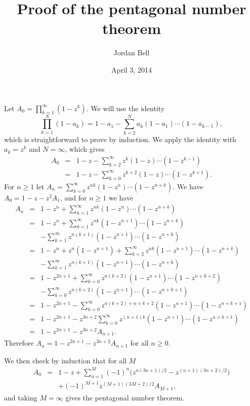 \documentclass{article}
\begin{document}
\title{Proof of the pentagonal number theorem}
\author{Jordan Bell}
\date{April 3, 2014}
\maketitle

Let $A_0=\prod_{k=1}^\infty (1-z^k)$. We will use the identity
\[
\prod_{k=1}^N (1-a_k) = 1- a_1 - \sum_{k=2}^N a_k(1-a_1)\cdots(1-a_{k-1}),
\]
which 
is straightforward to prove by induction. We apply the identity with $a_k=z^k$ and $N=\infty$, which gives
\begin{eqnarray*}
A_0&=&1-z-\sum_{k=2}^\infty z^k(1-z)\cdots(1-z^{k-1})\\
&=&1-z-\sum_{k=0}^\infty z^{k+2}(1-z)\cdots(1-z^{k+1}).
\end{eqnarray*}
For $n \geq 1$ let
$A_n=\sum_{k=0}^\infty z^{nk}(1-z^n)\cdots (1-z^{n+k})$. We have
$A_0=1-z-z^2A_1$, and for $n \geq 1$ we have
\begin{eqnarray*}
A_n&=&1-z^n+\sum_{k=1}^\infty z^{nk}(1-z^n)\cdots(1-z^{n+k})\\
&=&1-z^n+\sum_{k=1}^\infty z^{nk}(1-z^{n+1})\cdots(1-z^{n+k})\\
&&-\sum_{k=1}^\infty z^{n(k+1)}(1-z^{n+1})\cdots(1-z^{n+k})\\
&=&1-z^n+z^n(1-z^{n+1})+\sum_{k=2}^\infty z^{nk}(1-z^{n+1})\cdots(1-z^{n+k})\\
&&-\sum_{k=1}^\infty z^{n(k+1)}(1-z^{n+1})\cdots(1-z^{n+k})\\
&=&1-z^{2n+1}+\sum_{k=0}^\infty z^{n(k+2)}(1-z^{n+1})\cdots(1-z^{n+k+2})\\
&&-\sum_{k=0}^\infty z^{n(k+2)}(1-z^{n+1})\cdots(1-z^{n+k+1})\\
&=&1-z^{2n+1}-\sum_{k=0}^\infty z^{n(k+2)+n+k+2} (1-z^{n+1})\cdots (1-z^{n+k+1})\\
&=&1-z^{2n+1}-z^{3n+2}\sum_{k=0}^\infty z^{(n+1)k}(1-z^{n+1})\cdots(1-z^{n+k+1})\\
&=&1-z^{2n+1}-z^{3n+2}A_{n+1}.
\end{eqnarray*}
Therefore $A_n=1-z^{2n+1}-z^{3n+2}A_{n+1}$ for all $n \geq 0$.

We then check by induction that for all $M$
\begin{eqnarray*}
A_0&=&1-z+\sum_{n=1}^M (-1)^n \Big( z^{n(3n+1)/2}-z^{(n+1)(3n+2)/2} \Big)\\
&&+(-1)^{M+1} z^{(M+1)(3M+2)/2}A_{M+1},
\end{eqnarray*}
and taking $M=\infty$ gives the pentagonal number theorem.
\end{document}
